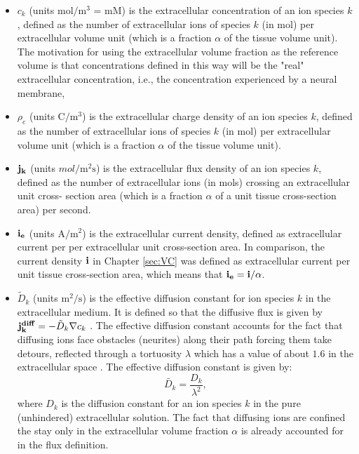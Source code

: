 \begin{itemize}
\item $c_k$ (units $\mathrm{mol/m^3}$ = mM) is the extracellular concentration of an ion species $k$, defined as the number of extracellular ions of species $k$ (in mol) per extracellular volume unit (which is a fraction $\alpha$ of the tissue volume unit). The motivation for using the extracellular volume fraction as the reference volume is that concentrations defined in this way will be the "real" extracellular concentration, i.e., the concentration experienced by a neural membrane, 

\item $\rho_e$ (units $\mathrm{C/m^3}$) is the extracellular charge density
of an ion species $k$, defined as the number of extracellular ions of species $k$ (in mol) per extracellular volume unit (which is a fraction $\alpha$ of the tissue volume unit).

\item ${\bf j_k}$ (units $mol/\mathrm{m^2s}$) is the extracellular flux density of an ion species $k$, defined as the number of extracellular ions (in mols) crossing an extracellular unit cross- section area (which is a fraction $\alpha$ of a unit tissue cross-section area) per second.

\item  ${\bf i_e}$ (units $\mathrm{A/m^2}$) is the extracellular current density, defined as extracellular current per per extracellular unit cross-section area. In comparison, the current density ${\bf i}$ in Chapter \ref{sec:VC} was defined as extracellular current per unit tissue cross-section area, which means that ${\bf i_e} = {\bf i}/\alpha$.

\item $\tilde{D}_k$ (units $\mathrm{m^2/s}$) is the effective diffusion constant  for ion species $k$ in the extracellular medium. It is defined so that the diffusive flux is given by ${\bf j_k^{diff}} = -\tilde{D}_k \nabla c_k$ \citep{nicholson2001}. The effective diffusion constant accounts for the fact that diffusing ions face obstacles (neurites) along their path forcing them take detours, reflected through a tortuosity $\lambda$ which has a value of about 
$1.6$ in the extracellular space \citep{Nicholson1998}. The effective diffusion constant is given by:
\begin{equation}
\tilde{D_k} = \frac{D_k}{\lambda^2}, 
\label{Eldiff:eq:diffconst}
\end{equation}
where $D_k$ is the diffusion constant for an ion species $k$ in the pure (unhindered) extracellular solution. The fact that diffusing ions are confined the stay only in the extracellular volume fraction $\alpha$ is already accounted for in the flux definition. 


\end{itemize}
